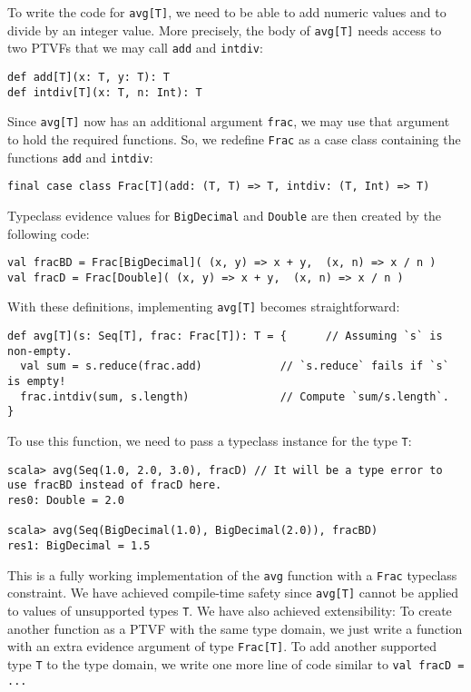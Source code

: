 To write the code for \lstinline!avg[T]!, we need to be able to add
numeric values and to divide by an integer value. More precisely,
the body of \lstinline!avg[T]! needs access to two PTVFs that we
may call \lstinline!add! and \lstinline!intdiv!:
\begin{lstlisting}
def add[T](x: T, y: T): T
def intdiv[T](x: T, n: Int): T
\end{lstlisting}
Since \lstinline!avg[T]! now has an additional argument \lstinline!frac!,
we may use that argument to hold the required functions. So, we redefine
\lstinline!Frac! as a case class containing the functions \lstinline!add!
and \lstinline!intdiv!:
\begin{lstlisting}
final case class Frac[T](add: (T, T) => T, intdiv: (T, Int) => T)
\end{lstlisting}
Typeclass evidence values for \lstinline!BigDecimal! and \lstinline!Double!
are then created by the following code:
\begin{lstlisting}
val fracBD = Frac[BigDecimal]( (x, y) => x + y,  (x, n) => x / n )
val fracD = Frac[Double]( (x, y) => x + y,  (x, n) => x / n )
\end{lstlisting}
With these definitions, implementing \lstinline!avg[T]! becomes straightforward:
\begin{lstlisting}
def avg[T](s: Seq[T], frac: Frac[T]): T = {      // Assuming `s` is non-empty.
  val sum = s.reduce(frac.add)            // `s.reduce` fails if `s` is empty!
  frac.intdiv(sum, s.length)              // Compute `sum/s.length`.
}
\end{lstlisting}
To use this function, we need to pass a typeclass instance for the
type \lstinline!T!:
\begin{lstlisting}
scala> avg(Seq(1.0, 2.0, 3.0), fracD) // It will be a type error to use fracBD instead of fracD here.
res0: Double = 2.0

scala> avg(Seq(BigDecimal(1.0), BigDecimal(2.0)), fracBD)
res1: BigDecimal = 1.5
\end{lstlisting}

This is a fully working implementation of the \lstinline!avg! function
with a \lstinline!Frac! typeclass constraint. We have achieved compile-time
safety since \lstinline!avg[T]! cannot be applied to values of unsupported
types \lstinline!T!. We have also achieved extensibility: To create
another function as a PTVF with the same type domain, we just write
a function with an extra evidence argument of type \lstinline!Frac[T]!.
To add another supported type \lstinline!T! to the type domain, we
write one more line of code similar to \lstinline!val fracD = ...!


